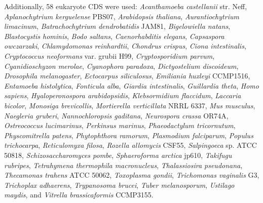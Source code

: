 Additionally, 58 eukaryote CDS were used:
\textit{Acanthamoeba castellanii} str. Neff,
\textit{Aplanochytrium kerguelense} PBS07,
\textit{Arabidopsis thaliana},
\textit{Aurantiochytrium limacinum},
\textit{Batrachochytrium dendrobatidis} JAM81,
\textit{Bigelowiella natans},
\textit{Blastocystis hominis},
\textit{Bodo saltans},
\textit{Caenorhabditis elegans},
\textit{Capsaspora owczarzaki},
\textit{Chlamydomonas reinhardtii},
\textit{Chondrus crispus},
\textit{Ciona intestinalis},
\textit{Cryptococcus neoformans} var. grubii H99,
\textit{Cryptosporidium parvum},
\textit{Cyanidioschyzon merolae},
\textit{Cyanophora paradoxa},
\textit{Dictyostelium discoideum},
\textit{Drosophila melanogaster},
\textit{Ectocarpus siliculosus},
\textit{Emiliania huxleyi} CCMP1516,
\textit{Entamoeba histolytica},
\textit{Fonticula alba},
\textit{Giardia intestinalis},
\textit{Guillardia theta},
\textit{Homo sapiens},
\textit{Hyaloperonospora arabidopsidis},
\textit{Klebsormidium flaccidum},
\textit{Laccaria bicolor},
\textit{Monosiga brevicollis},
\textit{Mortierella verticillata} NRRL 6337,
\textit{Mus musculus},
\textit{Naegleria gruberi},
\textit{Nannochloropsis gaditana},
\textit{Neurospora crassa} OR74A,
\textit{Ostreococcus lucimarinus},
\textit{Perkinsus marinus},
\textit{Phaeodactylum tricornutum},
\textit{Physcomitrella patens},
\textit{Phytophthora ramorum},
\textit{Plasmodium falciparum},
\textit{Populus trichocarpa},
\textit{Reticulomyxa filosa},
\textit{Rozella allomycis} CSF55,
\textit{Salpingoeca} sp. ATCC 50818,
\textit{Schizosaccharomyces pombe},
\textit{Sphaeroforma arctica} jp610,
\textit{Takifugu rubripes},
\textit{Tetrahymena thermophila macronucleus},
\textit{Thalassiosira pseudonana},
\textit{Thecamonas trahens} ATCC 50062,
\textit{Toxoplasma gondii},
\textit{Trichomonas vaginalis} G3,
\textit{Trichoplax adhaerens},
\textit{Trypanosoma brucei},
\textit{Tuber melanosporum},
\textit{Ustilago maydis}, and
\textit{Vitrella brassicaformis} CCMP3155.

